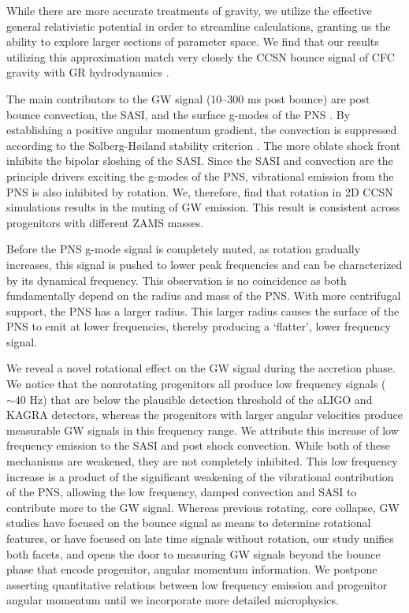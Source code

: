 \documentclass[twocolumn,times]{aastex62}  %
\begin{document}
While there are more accurate treatments of gravity, we utilize the effective general relativistic potential in order to streamline calculations, granting us the ability to explore larger sections of parameter space. 
We find that our results utilizing this approximation match very closely the CCSN bounce signal of CFC gravity with GR hydrodynamics \citep{richers:2017}.  

The main contributors to the GW signal (10--300 ms post bounce) are post bounce convection, the SASI, and the surface g-modes of the PNS \citep{moro:2018}.  By establishing a positive angular momentum gradient, the convection is suppressed according to the Solberg-H{\o}iland stability criterion \citep{endal:1978,fryer:2000}.  The more oblate shock front inhibits the bipolar sloshing of the SASI.  Since the SASI and convection are the principle drivers exciting the g-modes of the PNS, vibrational emission from the PNS is also inhibited by rotation.  
We, therefore, find that rotation in 2D CCSN simulations results in the muting of GW emission.
This result is consistent across progenitors with different ZAMS masses. 

Before the PNS g-mode signal is completely muted, as rotation gradually increases, this signal is pushed to lower peak frequencies and can be characterized by its dynamical frequency.  This observation is no coincidence as both  fundamentally depend on the radius and mass of the PNS.  With more centrifugal support, the PNS has a larger radius.  This larger radius causes the surface of the PNS to emit at lower frequencies, thereby producing a `flatter', lower frequency signal.

We reveal a novel rotational effect on the GW signal during the accretion phase.  We notice that the nonrotating progenitors all produce low frequency signals ($\sim 40$ Hz) that are below the plausible detection threshold of the aLIGO and KAGRA detectors, whereas the progenitors with larger angular velocities produce measurable GW signals in this frequency range.  We attribute this increase of low frequency emission to the SASI and post shock convection.  While both of these mechanisms are weakened, they are not completely inhibited.  This low frequency increase is a product of the significant weakening of the vibrational contribution of the PNS, allowing the low frequency, damped convection and SASI to contribute more to the GW signal.  Whereas previous rotating, core collapse, GW studies have focused on the bounce signal as means to determine rotational features, or have focused on late time signals without rotation, our study unifies both facets, and opens the door to measuring GW signals beyond the bounce phase that encode progenitor, angular momentum information. 
We postpone asserting quantitative relations between low frequency emission and progenitor angular momentum until we incorporate more detailed microphysics.
\end{document}
